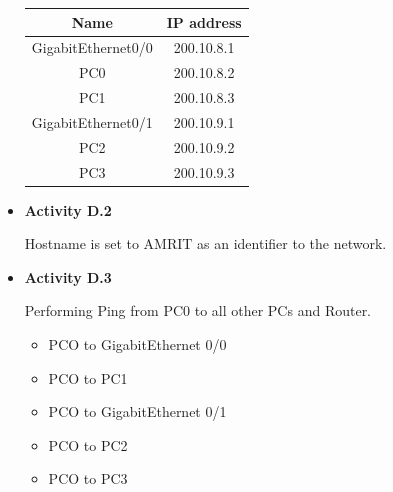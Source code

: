 \documentclass[12pt]{article}
\begin{document}
\begin{itemize}
            \begin{table}[H]
                  \centering
                  \begin{tabular}{|c|c|}
                        \hline
                        \textbf{Name}      & \textbf{IP address} \\
                        \hline
                        GigabitEthernet0/0 & 200.10.8.1          \\
                        \hline
                        PC0                & 200.10.8.2          \\
                        \hline
                        PC1                & 200.10.8.3          \\
                        \hline
                        GigabitEthernet0/1 & 200.10.9.1          \\
                        \hline
                        PC2                & 200.10.9.2          \\
                        \hline
                        PC3                & 200.10.9.3          \\
                        \hline
                  \end{tabular}
            \end{table}
      \item \textbf{Activity D.2}

            Hostname is set to AMRIT as an identifier to the network.

      \item \textbf{Activity D.3}

            Performing Ping from PC0 to all other PCs and Router.
            \begin{itemize}
                  \item PCO to GigabitEthernet 0/0
                  \item PCO to PC1
                  \item PCO to GigabitEthernet 0/1
                  \item PCO to PC2
                  \item PCO to PC3
            \end{itemize}


\end{itemize}
\end{document}
